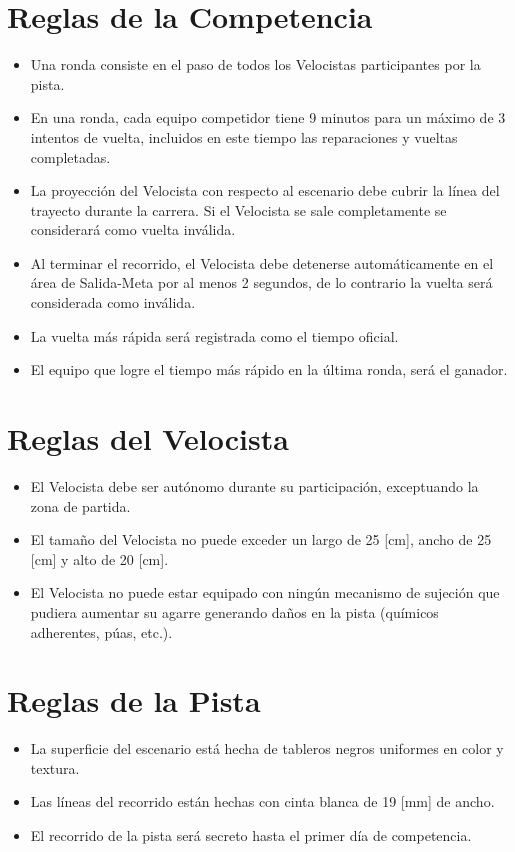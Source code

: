 \documentclass[12pt,a4paper]{article}
\begin{document}
\section*{Reglas de la Competencia}
\begin{itemize}
    \item Una ronda consiste en el paso de todos los Velocistas participantes por la pista.
    \item En una ronda, cada equipo competidor tiene 9 minutos para un máximo de 3 intentos de vuelta, incluidos en este tiempo las reparaciones y vueltas completadas.
    \item La proyección del Velocista con respecto al escenario debe cubrir la línea del trayecto durante la carrera. Si el Velocista se sale completamente se considerará como vuelta inválida.
    \item Al terminar el recorrido, el Velocista debe detenerse automáticamente en el área de Salida-Meta por al menos 2 segundos, de lo contrario la vuelta será considerada como inválida.
    \item La vuelta más rápida será registrada como el tiempo oficial.
    \item El equipo que logre el tiempo más rápido en la última ronda, será el ganador.
\end{itemize}

\section*{Reglas del Velocista}
\begin{itemize}
    \item El Velocista debe ser autónomo durante su participación, exceptuando la zona de partida.
    \item El tamaño del Velocista no puede exceder un largo de 25 [cm], ancho de 25 [cm] y alto de 20 [cm].
    \item El Velocista no puede estar equipado con ningún mecanismo de sujeción que pudiera aumentar su agarre generando daños en la pista (químicos adherentes, púas, etc.).
\end{itemize}

\section*{Reglas de la Pista}
\begin{itemize}
    \item La superficie del escenario está hecha de tableros negros uniformes en color y textura.
    \item Las líneas del recorrido están hechas con cinta blanca de 19 [mm] de ancho.
    \item El recorrido de la pista será secreto hasta el primer día de competencia.
\end{itemize}
\end{document}
